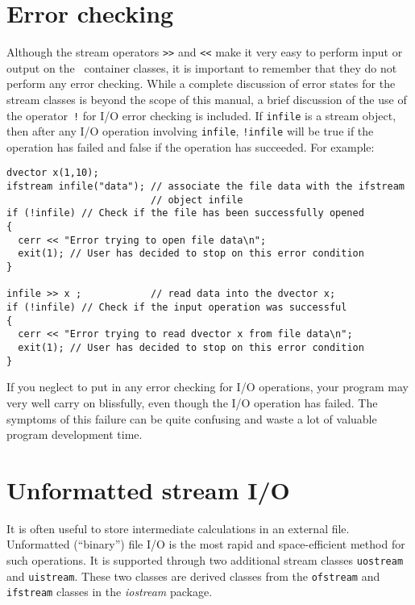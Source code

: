 \documentclass{admbmanual}
\begin{document}
 
\section{Error checking}

Although the stream operators \texttt{>{}>} and \texttt{<{}<} make it very easy to
perform input or output on the \scAD\ container classes, it is important to
remember that they do not perform any error checking. While a complete 
discussion of error states for the stream classes is beyond
the scope of this manual, a brief discussion of the use of the 
operator~\texttt{!} for I/O error checking is included. If
\texttt{infile} is a stream object, then after any I/O operation
involving \texttt{infile}, \texttt{!infile} will be true if the operation
has failed and false if the operation has succeeded. 
For example:
\begin{lstlisting}
dvector x(1,10);
ifstream infile("data"); // associate the file data with the ifstream 
                         // object infile
if (!infile) // Check if the file has been successfully opened
{
  cerr << "Error trying to open file data\n";  
  exit(1); // User has decided to stop on this error condition
}
                            
infile >> x ;            // read data into the dvector x;
if (!infile) // Check if the input operation was successful
{
  cerr << "Error trying to read dvector x from file data\n";  
  exit(1); // User has decided to stop on this error condition
}
\end{lstlisting}

If you neglect to put in any error checking for I/O operations, your
program may very well carry on blissfully, even though the I/O operation has
failed. The symptoms of this failure can be quite confusing
and waste a lot of valuable program development time.


\section{Unformatted stream I/O}

It is often useful to store intermediate calculations in an external
file. Unformatted (``binary'') file I/O is the most rapid and space-efficient method for such operations.
It is supported
through two additional stream classes \texttt{uostream} and \texttt{uistream}.
These two classes are derived classes from the
\texttt{ofstream} and \texttt{ifstream} classes in the \textit{iostream} package. 
\end{document}
